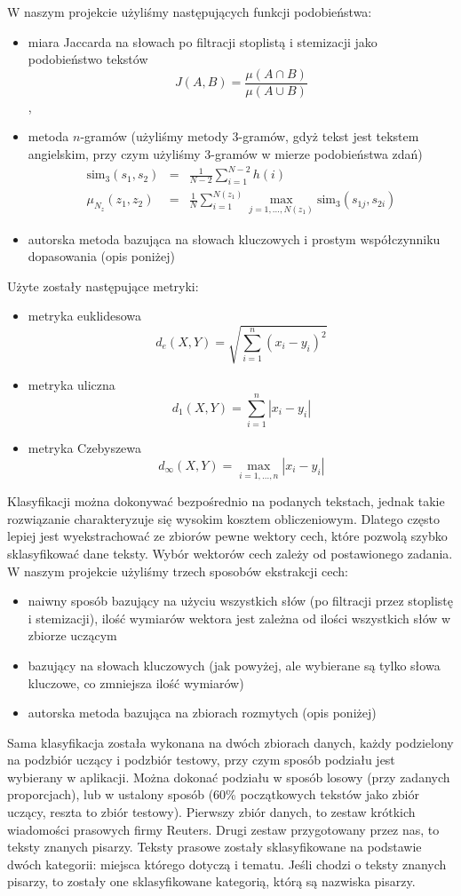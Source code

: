 \documentclass[a4paper]{classrep}
\begin{document}
W naszym projekcie użyliśmy następujących funkcji podobieństwa:
\begin{itemize}
\item miara Jaccarda na słowach po filtracji stoplistą i stemizacji jako podobieństwo tekstów
\[J(A,B) = \frac{\mu(A\cap B)}{\mu(A \cup B)}\],
\item metoda \(n\)-gramów (użyliśmy metody 3-gramów, gdyż tekst jest tekstem angielskim, przy czym użyliśmy 3-gramów w mierze podobieństwa zdań)
\begin{eqnarray*}
\textrm{sim}_3(s_1,s_2) & = & \frac{1}{N-2}\sum_{i=1}^{N-2}h(i) \\
\mu_{N_z}(z_1, z_2) & = & \frac{1}{N} \sum_{i=1}^{N(z_1)}\max_{j=1,\ldots,N(z_1)} \textrm{sim}_3(s_{1j}, s_{2i})
\end{eqnarray*}
\item autorska metoda bazująca na słowach kluczowych i prostym współczynniku dopasowania (opis poniżej) 
\end{itemize}
Użyte zostały następujące metryki:
\begin{itemize}
\item metryka euklidesowa
\[d_e(X,Y)=\sqrt{\sum_{i=1}^n(x_i-y_i)^2}\]
\item metryka uliczna
\[d_1(X,Y)=\sum_{i=1}^n|x_i-y_i|\]
\item metryka Czebyszewa
\[d_\infty(X,Y)=\max_{i=1,\ldots,n}|x_i-y_i|\]
\end{itemize}

Klasyfikacji można dokonywać bezpośrednio na podanych tekstach, jednak takie rozwiązanie charakteryzuje się wysokim kosztem obliczeniowym. Dlatego często lepiej jest
wyekstrachować ze zbiorów pewne wektory cech, które pozwolą szybko sklasyfikować dane teksty. Wybór wektorów cech zależy od postawionego zadania.
W naszym projekcie użyliśmy trzech sposobów ekstrakcji cech:
\begin{itemize}
\item naiwny sposób bazujący na użyciu wszystkich słów (po filtracji przez stoplistę i stemizacji), ilość wymiarów wektora jest zależna od ilości wszystkich słów w zbiorze uczącym
\item bazujący na słowach kluczowych (jak powyżej, ale wybierane są tylko słowa kluczowe, co zmniejsza ilość wymiarów)
\item autorska metoda bazująca na zbiorach rozmytych (opis poniżej)
\end{itemize}

Sama klasyfikacja została wykonana na dwóch zbiorach danych, każdy podzielony na podzbiór uczący i podzbiór testowy, przy czym sposób podziału jest wybierany w aplikacji.
Można dokonać podziału w sposób losowy (przy zadanych proporcjach), lub w ustalony sposób (60\% początkowych tekstów jako zbiór uczący, reszta to zbiór testowy).
Pierwszy zbiór danych, to zestaw krótkich wiadomości prasowych firmy Reuters. Drugi zestaw przygotowany przez nas, to teksty znanych pisarzy. Teksty prasowe zostały
sklasyfikowane na podstawie dwóch kategorii: miejsca którego dotyczą i tematu. Jeśli chodzi o teksty znanych pisarzy, to zostały one sklasyfikowane kategorią, którą są nazwiska pisarzy.
\end{document}
